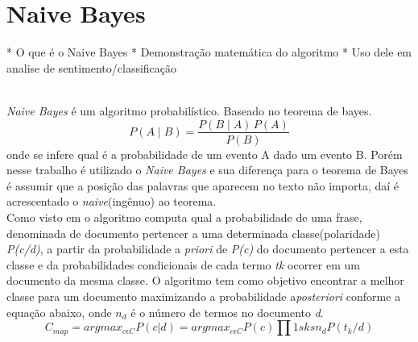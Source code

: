 \section{Naive Bayes}\label{sec:naive_bayes}
* O que é o Naive Bayes
* Demonstração matemática do algoritmo
* Uso dele em analise de sentimento/classificação


\\ \emph{Naive Bayes} é um algoritmo probabilístico. Baseado no teorema de bayes. $$ P(A \mid B) = \frac{P(B \mid A) \, P(A)}{P(B)} $$ onde se infere qual é a probabilidade de um evento A dado um evento B. Porém nesse trabalho é utilizado o \emph{Naive Bayes} e sua diferença para o teorema de Bayes é assumir que a posição das palavras que aparecem no texto não importa, daí é acrescentado o \emph{naive}(ingênuo) ao teorema.
\\ Como visto em \cite{lucca2013implementaccao} o algoritmo computa qual a probabilidade de uma frase, denominada de documento pertencer a uma determinada classe(polaridade) \emph{P(c/d)}, a partir da probabilidade a \emph{priori} de \emph{P(c)} do documento pertencer a esta classe e da probabilidades condicionais de cada termo \emph{tk} ocorrer em um documento da mesma classe. O algoritmo tem como objetivo encontrar a melhor classe para um documento maximizando a probabilidade a\emph{posteriori} conforme a equação abaixo, onde $ n_{d} $ é o número de termos no documento \emph{d}. $$ C_{map}= argmax_{c \epsilon C}P(c|d)=argmax_{c \epsilon C}P(c)\prod 1sksn_{d}P(t_{k}/d) $$